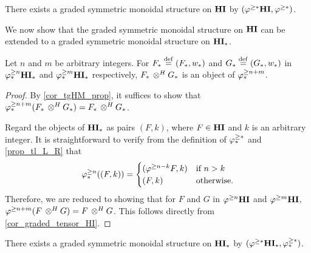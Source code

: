 \begin{cor}\label{cor_graded_tensor_HI}
There exists a graded symmetric monoidal structure on $\mathbf{HI}$ by
$(\varphi^{\geq *}\mathbf{HI}, \varphi^{\geq *})$.
\end{cor}

We now show that the graded symmetric monoidal structure on $\mathbf{HI}$
can be extended to a graded symmetric monoidal structure on $\mathbf{HI}_*$.

\begin{prop}\label{prop_graded_mon_struct_HM}
Let $n$ and $m$ be arbitrary integers. For $F_* \stackrel{\mathrm{def}}{=} (F_*, 
w_*)$ and $G_* \stackrel{\mathrm{def}}{=} (G_*,w_*)$ in $\varphi^{\geq n}_{*}\mathbf{HI}_*$ and 
$\varphi^{\geq m}_{*}\mathbf{HI}_*$ respectively, $F_* \,\otimes^H G_*$ is an object of 
$\varphi^{\geq n + m}_{*}$.
\end{prop}
\begin{proof}
By \ref{cor_tgHM_prop}, it suffices to show that $\varphi^{\geq n + m}_{*}(F_*
\,\otimes^H G_*) = F_* \,\otimes^H G_*$.

Regard the objects of $\mathbf{HI}_*$ as pairs $(F, k)$, where $F \in \mathbf{HI}$
and $k$ is an arbitrary integer. It is straightforward to 
verify from the definition of $\varphi^{\geq *}_{*}$ and \ref{prop_tl_L_R} 
that
\[
\varphi^{\geq n}_{*}((F, k)) = \begin{cases}
(\varphi^{\geq n - k}F, k) &\textrm{if }n > k\\
(F, k)             &\textrm{otherwise}.
\end{cases}
\]
Therefore, we are reduced to showing that for $F$ and $G$ in
$\varphi^{\geq n}\mathbf{HI}$ and $\varphi^{\geq m}\mathbf{HI}$, $\varphi^{\geq n + m}(F \,\otimes^H G) =
F \,\otimes^H G$. This follows directly from \ref{cor_graded_tensor_HI}.
\end{proof}

\begin{cor}\label{cor_graded_mon_struct_HM}
There exists a graded symmetric monoidal structure on $\mathbf{HI}_*$ by
$(\varphi^{\geq *}\mathbf{HI}_*, \varphi^{\geq *}_{*})$.
\end{cor}
